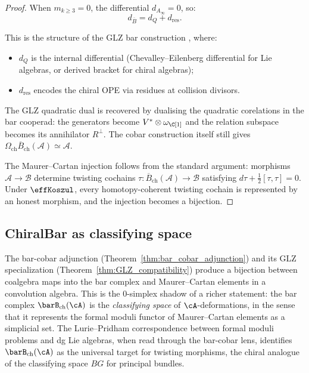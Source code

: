 \begin{proof}
When $m_{k \geq 3} = 0$, the differential $d_{A_\infty} = 0$, so:
\begin{equation}
d_{\overline{B}} = d_Q + d_{\text{res}}.
\end{equation}

This is the structure of the GLZ bar construction \cite{GLZ22}, where:
\begin{itemize}
\item $d_Q$ is the internal differential (Chevalley--Eilenberg differential for Lie algebras, or derived bracket for chiral algebras);
\item $d_{\text{res}}$ encodes the chiral OPE via residues at collision divisors.
\end{itemize}

The GLZ quadratic dual is recovered by dualising the quadratic
corelations in the bar cooperad: the generators become
$V^* \otimes \omega_\C[1]$ and the relation subspace becomes its
annihilator $R^\perp$. The cobar construction itself still gives
$\Omega_{\text{ch}}\overline{B}_{\text{ch}}(\mathcal{A}) \simeq
\mathcal{A}$.

The Maurer--Cartan injection follows from the standard argument:
morphisms $\mathcal{A} \to \mathcal{B}$ determine twisting cochains
$\tau : \overline{B}_{\text{ch}}(\mathcal{A}) \to \mathcal{B}$
satisfying $d\tau + \frac{1}{2}[\tau, \tau] = 0$. Under
$\effKoszul$, every homotopy-coherent twisting cochain is represented
by an honest morphism, and the injection becomes a bijection.
\end{proof}

\subsection{ChiralBar as classifying space}
\label{subsec:chiralbar-classifying-space}

The bar-cobar adjunction (Theorem~\ref{thm:bar_cobar_adjunction})
and its GLZ specialization (Theorem~\ref{thm:GLZ_compatibility})
produce a bijection between coalgebra maps into the bar complex
and Maurer--Cartan elements in a convolution algebra. This is
the $0$-simplex shadow of a richer statement: the bar complex
$\barB_{\mathrm{ch}}(\cA)$ is the \emph{classifying space} of
$\cA$-deformations, in the sense that it represents the formal
moduli functor of Maurer--Cartan elements as a simplicial set.
The Lurie--Pridham correspondence between formal moduli problems
and dg Lie algebras, when read through the bar-cobar lens,
identifies $\barB_{\mathrm{ch}}(\cA)$ as the universal target
for twisting morphisms, the chiral analogue of the classifying
space $BG$ for principal bundles.

